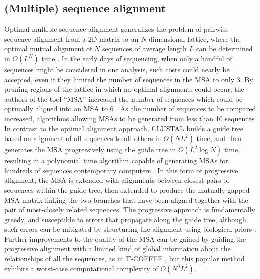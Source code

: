 \subsection{(Multiple) sequence alignment}
\label{sec:MSA}

Optimal multiple sequence alignment generalizes the problem of pairwise sequence alignment from a 2D matrix to an $N$-dimensional lattice, where the optimal mutual alignment of $N$ sequences of average length $L$ can be determined in $O(L^{N})$ time \cite{carrillo1988multiple}.
In the early days of sequencing, when only a handful of sequences might be considered in one analysis, such costs could nearly be accepted, even if they limited the number of sequences in the MSA to only 3.
By pruning regions of the lattice in which no optimal alignments could occur, the authors of the tool ``MSA'' increased the number of sequences which could be optimally aligned into an MSA to 6 \cite{lipman1989tool}.
As the number of sequences to be compared increased, algorithms allowing MSAs to be generated from less than 10 sequences
In contrast to the optimal alignment approach, CLUSTAL builds a guide tree based on alignment of all sequences to all others in $O(NL^{2})$ time, and then generates the MSA progressively using the guide tree in $O(L^{2}\log N)$ time, resulting in a polynomial time algorithm capable of generating MSAs for hundreds of sequences contemporary computers \cite{higgins1988clustal}.
In this form of progressive alignment, the MSA is extended with alignments between closest pairs of sequences within the guide tree, then extended to produce the mutually gapped MSA matrix linking the two branches that have been aligned together with the pair of most-closely related sequences.
The progressive approach is fundamentally greedy, and susceptible to errors that propagate along the guide tree, although such errors can be mitigated by structuring the alignment using biological priors \cite{thompson1994clustal}.
Further improvements to the quality of the MSA can be gained by guiding the progressive alignment with a limited kind of global information about the relationships of all the sequences, as in T-COFFEE \cite{notredame2000t}, but this popular method exhibits a worst-case computational complexity of $O(N^{3}L^{2})$.

